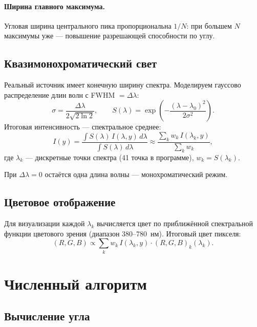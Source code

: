 \documentclass[12pt,a4paper]{article}
\begin{document}
\paragraph{Ширина главного максимума.} Угловая ширина центрального пика
пропорциональна \(1/N\): при большем \(N\) максимумы уже --- повышение
разрешающей способности по углу.

\subsection{Квазимонохроматический свет}

Реальный источник имеет конечную ширину спектра. Моделируем гауссово
распределение длин волн с FWHM \(=\Delta\lambda\):
\begin{equation}\label{eq:gauss}
\sigma = \frac{\Delta\lambda}{2\sqrt{2\ln 2}},
\qquad
S(\lambda)=\exp\!\left(-\frac{(\lambda-\lambda_0)^2}{2\sigma^2}\right).
\end{equation}
Итоговая интенсивность --- спектральное среднее:
\begin{equation}\label{eq:spectral}
I(y)=\frac{\displaystyle\int S(\lambda)\,I(\lambda,y)\,d\lambda}
           {\displaystyle\int S(\lambda)\,d\lambda}
\approx\frac{\sum_k w_k\,I(\lambda_k,y)}{\sum_k w_k},
\end{equation}
где \(\lambda_k\) --- дискретные точки спектра (41 точка в программе),
\(w_k=S(\lambda_k)\).

При \(\Delta\lambda=0\) остаётся одна длина волны --- монохроматический режим.

\subsection{Цветовое отображение}

Для визуализации каждой \(\lambda_k\) вычисляется цвет по приближённой
спектральной функции цветового зрения (диапазон 380–780~нм). Итоговый цвет
пикселя:
\[
(R,G,B) \propto \sum_k w_k\,I(\lambda_k,y)\cdot(R,G,B)_k(\lambda_k).
\]

\section{Численный алгоритм}

\subsection{Вычисление угла}
\end{document}
